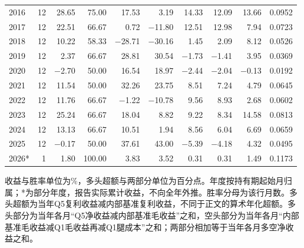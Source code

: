 \begin{longtable}{lrrrrrrrrr}
2016 & 12 & 28.65 & 75.00 & 17.53 & 3.19 & 14.33 & 12.09 & 13.66 & 0.0952 \\
2017 & 12 & 22.51 & 66.67 & 0.72 & $-$11.80 & 12.51 & 12.98 & 7.94 & 0.0723 \\
2018 & 12 & 10.22 & 58.33 & $-$28.71 & $-$30.16 & 1.45 & 2.09 & 8.12 & 0.0526 \\
2019 & 12 & 2.37 & 66.67 & 28.81 & 30.54 & $-$1.73 & $-$1.41 & 3.95 & 0.0369 \\
2020 & 12 & $-$2.70 & 50.00 & 16.54 & 18.97 & $-$2.44 & $-$2.04 & $-$0.13 & 0.0192 \\
2021 & 12 & 11.54 & 50.00 & 32.26 & 23.75 & 8.51 & 7.24 & 4.79 & 0.0645 \\
2022 & 12 & 11.76 & 66.67 & $-$1.22 & $-$10.78 & 9.56 & 8.93 & 2.68 & 0.0602 \\
2023 & 12 & 25.24 & 66.67 & 18.04 & 8.82 & 9.22 & 8.34 & 14.58 & 0.0813 \\
2024 & 12 & 13.13 & 66.67 & 10.51 & 1.94 & 8.56 & 6.04 & 6.69 & 0.0659 \\
2025 & 12 & $-$0.17 & 50.00 & 37.61 & 43.00 & $-$5.39 & $-$4.18 & 4.32 & 0.0495 \\
2026* & 1 & 1.80 & 100.00 & 3.83 & 3.52 & 0.31 & 0.31 & 1.49 & 0.1173 \\
\end{longtable}
\noindent\footnotesize 收益与胜率单位为\%，多头超额与两部分单位为百分点。年度按持有期起始月归属；*为部分年度，报告实际累计收益，不向全年外推。胜率分母为该行月数。多头超额为当年Q5复利收益减内部基准复利收益，不同于正文的算术年化超额。多头部分为当年各月“Q5净收益减内部基准毛收益”之和，空头部分为当年各月“内部基准毛收益减Q1毛收益再减Q1腿成本”之和；两部分相加等于当年各月多空净收益之和。\par
\endgroup
